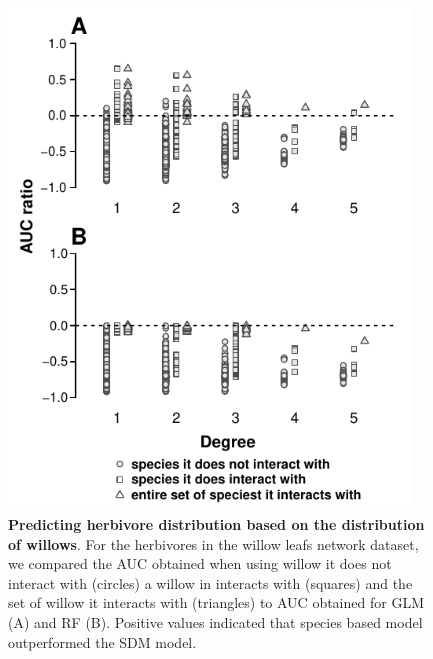 \begin{figure}
\centering
\includegraphics[width=0.95000\textwidth]{chapitre3/figS9.pdf}
\caption{\textbf{Predicting herbivore distribution based on the
distribution of willows}. For the herbivores in the willow leafs network
dataset, we compared the AUC obtained when using willow it does not
interact with (circles) a willow in interacts with (squares) and the set
of willow it interacts with (triangles) to AUC obtained for GLM (A) and
RF (B). Positive values indicated that species based model outperformed
the SDM model.\label{fig:ratauc}}
\end{figure}
